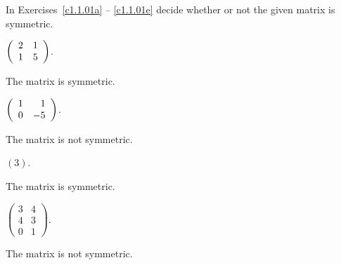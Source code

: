 \documentclass{ximera}
\begin{document}
\noindent In Exercises~\ref{c1.1.01a} -- \ref{c1.1.01e} decide whether or
not the given matrix is symmetric.
\begin{exercise} \label{c1.1.01a}
  $\left(\begin{array}{rr} 2 & 1\\ 1 &5\end{array}\right)$.
  \begin{multipleChoice}
  \end{multipleChoice}

\begin{solution}
The matrix is symmetric.

\end{solution}
\end{exercise}
\begin{exercise} \label{c1.1.01b}
  $\left(\begin{array}{rr} 1 & 1\\ 0 &-5\end{array}\right)$.
  \begin{multipleChoice}
  \end{multipleChoice}  

\begin{solution}
The matrix is not symmetric.

\end{solution}
\end{exercise}
\begin{exercise} \label{c1.1.01c}
  $(3)$.
  \begin{multipleChoice}
  \end{multipleChoice}  

\begin{solution}
The matrix is symmetric.

\end{solution}
\end{exercise}
\begin{exercise} \label{c1.1.01d}
  $\left( \begin{array}{rr}
            3 & 4 \\
            4 & 3 \\
            0 & 1 \end{array} \right)$.
  \begin{multipleChoice}
  \end{multipleChoice}          

\begin{solution}
The matrix is not symmetric.

\end{solution}
\end{exercise}
\end{document}
